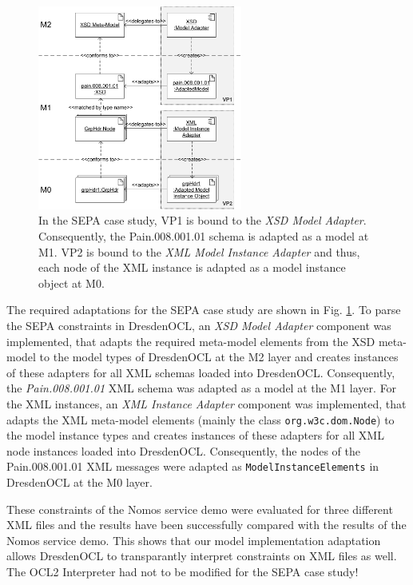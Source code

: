 \begin{figure}[!t]
	\centering
		\includegraphics[width=0.60\textwidth]{figures/casestudy02.pdf}
	\caption{In the SEPA case study, VP1 is bound to the \textit{XSD Model Adapter}. 
	  Consequently, the Pain.008.001.01 schema is adapted as a model at M1.
	  VP2 is bound to the \textit{XML Model Instance Adapter} and thus, each node of the XML
	  instance is adapted as a model instance object at M0.}
	\label{fig:casestudy02}
\end{figure}

The required adaptations for the SEPA case study are shown in Fig. \ref{fig:casestudy02}.
To parse the SEPA constraints
in DresdenOCL, an \textit{XSD Model Adapter} component was implemented, that 
adapts the required meta-model elements from the XSD meta-model to the model 
types of DresdenOCL at the M2 layer and creates instances of these adapters for all XML schemas 
loaded into DresdenOCL. 
Consequently, the \textit{Pain.008.001.01} XML schema was adapted as a model at the M1 layer.
For the XML instances, an \textit{XML Instance Adapter} component was implemented,
that adapts the XML meta-model elements (mainly the class \texttt{org.w3c.dom.Node})
to the model instance types and creates instances of these adapters for all XML node instances
loaded into DresdenOCL. Consequently, the nodes of the Pain.008.001.01 XML messages
were adapted as \texttt{ModelInstanceElements} in DresdenOCL at the M0 layer.

These constraints of the Nomos service demo were evaluated for three different XML files 
and the results have been successfully compared with the results of the Nomos service demo.
This shows that our model implementation adaptation allows DresdenOCL to transparantly interpret
constraints on XML files as well. The OCL2 Interpreter had not to be modified for the SEPA case study!


